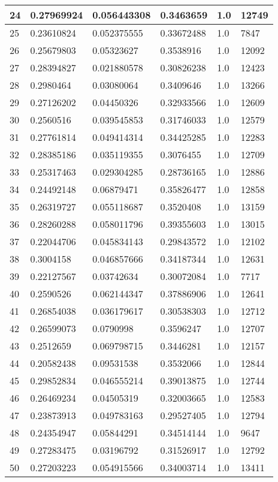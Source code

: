 \begin{longtable}{|l|l|l|l|l|l|}
24 & 0.27969924 & 0.056443308 & 0.3463659 & 1.0 & 12749 \\ \hline 
25 & 0.23610824 & 0.052375555 & 0.33672488 & 1.0 & 7847 \\ \hline 
26 & 0.25679803 & 0.05323627 & 0.3538916 & 1.0 & 12092 \\ \hline 
27 & 0.28394827 & 0.021880578 & 0.30826238 & 1.0 & 12423 \\ \hline 
28 & 0.2980464 & 0.03080064 & 0.3409646 & 1.0 & 13266 \\ \hline 
29 & 0.27126202 & 0.04450326 & 0.32933566 & 1.0 & 12609 \\ \hline 
30 & 0.2560516 & 0.039545853 & 0.31746033 & 1.0 & 12579 \\ \hline 
31 & 0.27761814 & 0.049414314 & 0.34425285 & 1.0 & 12283 \\ \hline 
32 & 0.28385186 & 0.035119355 & 0.3076455 & 1.0 & 12709 \\ \hline 
33 & 0.25317463 & 0.029304285 & 0.28736165 & 1.0 & 12886 \\ \hline 
34 & 0.24492148 & 0.06879471 & 0.35826477 & 1.0 & 12858 \\ \hline 
35 & 0.26319727 & 0.055118687 & 0.3520408 & 1.0 & 13159 \\ \hline 
36 & 0.28260288 & 0.058011796 & 0.39355603 & 1.0 & 13015 \\ \hline 
37 & 0.22044706 & 0.045834143 & 0.29843572 & 1.0 & 12102 \\ \hline 
38 & 0.3004158 & 0.046857666 & 0.34187344 & 1.0 & 12631 \\ \hline 
39 & 0.22127567 & 0.03742634 & 0.30072084 & 1.0 & 7717 \\ \hline 
40 & 0.2590526 & 0.062144347 & 0.37886906 & 1.0 & 12641 \\ \hline 
41 & 0.26854038 & 0.036179617 & 0.30538303 & 1.0 & 12712 \\ \hline 
42 & 0.26599073 & 0.0790998 & 0.3596247 & 1.0 & 12707 \\ \hline 
43 & 0.2512659 & 0.069798715 & 0.3446281 & 1.0 & 12157 \\ \hline 
44 & 0.20582438 & 0.09531538 & 0.3532066 & 1.0 & 12844 \\ \hline 
45 & 0.29852834 & 0.046555214 & 0.39013875 & 1.0 & 12744 \\ \hline 
46 & 0.26469234 & 0.04505319 & 0.32003665 & 1.0 & 12583 \\ \hline 
47 & 0.23873913 & 0.049783163 & 0.29527405 & 1.0 & 12794 \\ \hline 
48 & 0.24354947 & 0.05844291 & 0.34514144 & 1.0 & 9647 \\ \hline 
49 & 0.27283475 & 0.03196792 & 0.31526917 & 1.0 & 12792 \\ \hline 
50 & 0.27203223 & 0.054915566 & 0.34003714 & 1.0 & 13411 \\ \hline 
\end{longtable}